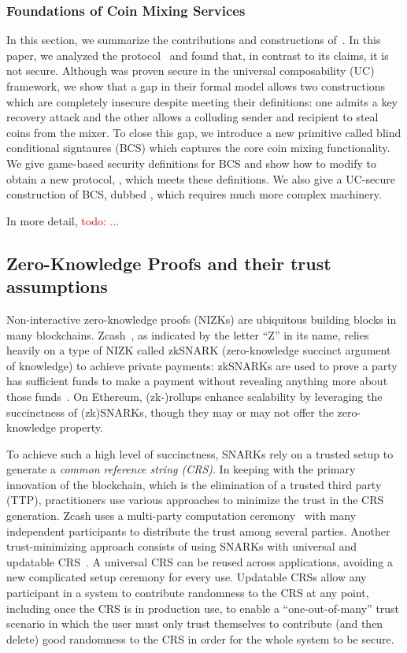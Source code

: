 \documentclass{article}
\newcommand{\todo}[1]{\textcolor{red}{todo: #1}}
\begin{document}
\subsubsection{Foundations of Coin Mixing Services~\texorpdfstring{\cite{CCS:GMMMTT22}}{[GMM+22]}}
In this section, we summarize the contributions and constructions of~\cite{CCS:GMMMTT22}. In this paper, we analyzed the \AAL protocol~\cite{SP:TaiMorMaf21} and found that, in contrast to its claims, it is not secure. Although \AAL was proven secure in the universal composability (UC)~\cite{FOCS:Canetti01} framework, we show that a gap in their formal model allows two constructions which are completely insecure despite meeting their definitions: one admits a key recovery attack and the other allows a colluding sender and recipient to steal coins from the mixer. To close this gap, we introduce a new primitive called blind conditional signtaures (BCS) which captures the core coin mixing functionality. We give game-based security definitions for BCS and show how to modify \AAL to obtain a new protocol, \AALplus, which meets these definitions. We also give a UC-secure construction of BCS, dubbed \AALUC, which requires much more complex machinery. 

In more detail, \todo{...}

\subsection{Zero-Knowledge Proofs and their trust assumptions}

Non-interactive zero-knowledge proofs (NIZKs) are ubiquitous building blocks in many blockchains. Zcash~\cite{zcash}, as indicated by the letter ``Z'' in its name, relies heavily on a type of NIZK called zkSNARK (zero-knowledge succinct argument of knowledge) to achieve private payments: zkSNARKs are used to prove a party has sufficient funds to make a payment without revealing anything more about those funds~\cite{SP:BCGGMT14}. On Ethereum, (zk-)rollups enhance scalability by leveraging the succinctness of (zk)SNARKs, though they may or may not offer the zero-knowledge property.

To achieve such a high level of succinctness, SNARKs rely on a trusted setup to generate a \emph{common reference string (CRS)}. In keeping with the primary innovation of the blockchain, which is the elimination of a trusted third party (TTP), practitioners use various approaches to minimize the trust in the CRS generation. Zcash uses a multi-party computation ceremony~\cite{zcash-ceremony} with many independent participants to distribute the trust among several parties. Another trust-minimizing approach consists of using SNARKs with universal and updatable CRS~\cite{C:GKMMM18,CCS:MBKM19,EC:CHMMVW20,EPRINT:GabWilCio19}. A universal CRS can be reused across applications, avoiding a new complicated setup ceremony for every use. Updatable CRSs allow any participant in a system to contribute randomness to the CRS at any point, including once the CRS is in production use, to enable a ``one-out-of-many'' trust scenario in which the user must only trust themselves to contribute (and then delete) good randomness to the CRS in order for the whole system to be secure.
\end{document}

